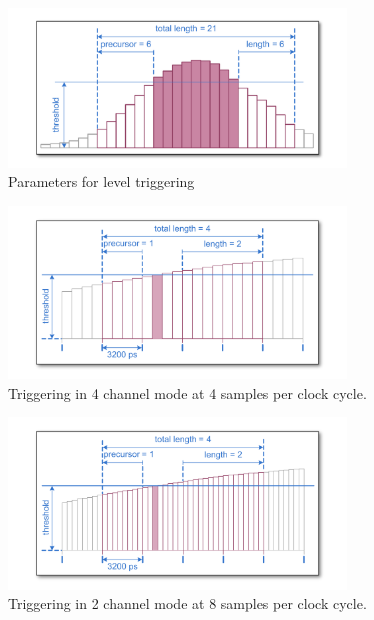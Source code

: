 		\begin{figure}[hb]
			\begin{center}
				\includegraphics[width=0.8\textwidth]{figures/level-trigger.pdf}
				\caption{Parameters for level triggering\label{fig:level-trigger}}
			\end{center}
		\end{figure}
	
		\begin{figure}[ht]
			\begin{center}
				\includegraphics[width=0.8\textwidth]{figures/4ChannelTriggering.pdf}
				\caption{Triggering in 4 channel mode at 4 samples per clock cycle.\label{fig:4ChannelTriggering}}
			\end{center}
		\end{figure}
	
		\begin{figure}[hb]
			\begin{center}
				\includegraphics[width=0.8\textwidth]{figures/2ChannelTriggering.pdf}
				\caption{Triggering in 2 channel mode at 8 samples per clock cycle.\label{fig:2ChannelTriggering}}
			\end{center}
		\end{figure}
	
